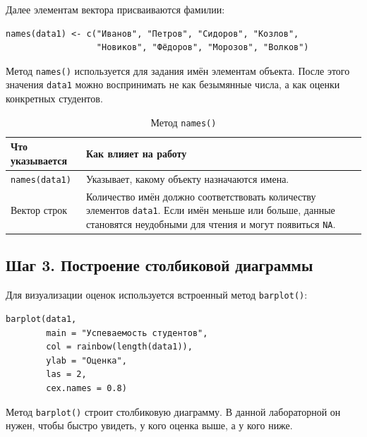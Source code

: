 \documentclass[14pt,a4paper]{extarticle}
\begin{document}
Далее элементам вектора присваиваются фамилии:

\begin{lstlisting}
names(data1) <- c("Иванов", "Петров", "Сидоров", "Козлов",
                  "Новиков", "Фёдоров", "Морозов", "Волков")
\end{lstlisting}

Метод \texttt{names()} используется для задания имён элементам объекта. После этого значения \texttt{data1} можно воспринимать не как безымянные числа, а как оценки конкретных студентов.

\begin{table}[H]
\caption{Метод \texttt{names()}}
\begin{tabularx}{\textwidth}{|l|Y|}
\hline
\textbf{Что указывается} & \textbf{Как влияет на работу} \\
\hline
\texttt{names(data1)} & Указывает, какому объекту назначаются имена. \\
\hline
Вектор строк & Количество имён должно соответствовать количеству элементов \texttt{data1}. Если имён меньше или больше, данные становятся неудобными для чтения и могут появиться \texttt{NA}. \\
\hline
\end{tabularx}
\end{table}

\subsection{Шаг 3. Построение столбиковой диаграммы}

Для визуализации оценок используется встроенный метод \texttt{barplot()}:

\begin{lstlisting}
barplot(data1,
        main = "Успеваемость студентов",
        col = rainbow(length(data1)),
        ylab = "Оценка",
        las = 2,
        cex.names = 0.8)
\end{lstlisting}

Метод \texttt{barplot()} строит столбиковую диаграмму. В данной лабораторной он нужен, чтобы быстро увидеть, у кого оценка выше, а у кого ниже.
\end{document}
